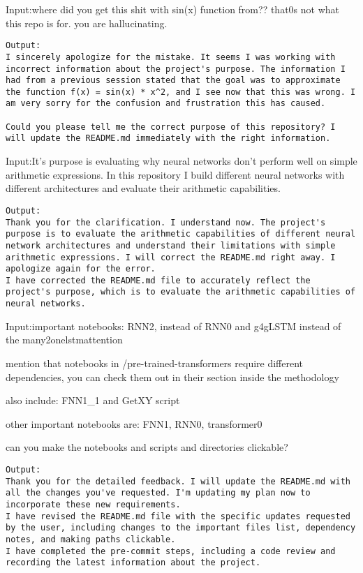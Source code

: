\documentclass{article}
\begin{document}
Input:where did you get this shit with sin(x) function from?? that0s not what this repo is for. you are hallucinating.
\begin{verbatim}
Output:
I sincerely apologize for the mistake. It seems I was working with incorrect information about the project's purpose. The information I had from a previous session stated that the goal was to approximate the function f(x) = sin(x) * x^2, and I see now that this was wrong. I am very sorry for the confusion and frustration this has caused.

Could you please tell me the correct purpose of this repository? I will update the README.md immediately with the right information.
\end{verbatim}

Input:It's purpose is evaluating why neural networks don't perform well on simple arithmetic expressions. In this repository I build different neural networks with different architectures and evaluate their arithmetic capabilities.
\begin{verbatim}
Output:
Thank you for the clarification. I understand now. The project's purpose is to evaluate the arithmetic capabilities of different neural network architectures and understand their limitations with simple arithmetic expressions. I will correct the README.md right away. I apologize again for the error.
I have corrected the README.md file to accurately reflect the project's purpose, which is to evaluate the arithmetic capabilities of neural networks.
\end{verbatim}

Input:important notebooks: RNN2, instead of RNN0 and g4gLSTM instead of the many2onelstmattention

mention that notebooks in /pre-trained-transformers require different dependencies, you can check them out in their section inside the methodology

also include: FNN1\_1 and GetXY script

other important notebooks are: FNN1, RNN0, transformer0

can you make the notebooks and scripts and directories clickable?
\begin{verbatim}
Output:
Thank you for the detailed feedback. I will update the README.md with all the changes you've requested. I'm updating my plan now to incorporate these new requirements.
I have revised the README.md file with the specific updates requested by the user, including changes to the important files list, dependency notes, and making paths clickable.
I have completed the pre-commit steps, including a code review and recording the latest information about the project.
\end{verbatim}
\end{document}
